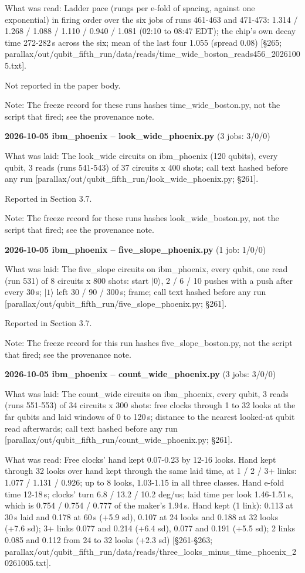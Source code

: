 \documentclass[11pt]{article}
\begin{document}
What was read: Ladder pace (rungs per e-fold of spacing, against one exponential) in firing order over the six jobs of runs 461-463 and 471-473: 1.314 / 1.268 / 1.088 / 1.110 / 0.940 / 1.081 (02:10 to 08:47 EDT); the chip's own decay time 272-282\,\textmu s across the six; mean of the last four 1.055 (spread 0.08) {[}\S{}265; parallax/out/qubit\_fifth\_run/data/reads/time\_wide\_boston\_reads456\_20261005.txt{]}.

Not reported in the paper body.

Note: The freeze record for these runs hashes time\_wide\_boston.py, not the script that fired; see the provenance note.

\textbf{2026-10-05 ibm\_phoenix -- look\_wide\_phoenix.py} (3 jobs: 3/0/0)

What was laid: The look\_wide circuits on ibm\_phoenix (120 qubits), every qubit, 3 reads (runs 541-543) of 37 circuits x 400 shots; call text hashed before any run {[}parallax/out/qubit\_fifth\_run/look\_wide\_phoenix.py; \S{}261{]}.

Reported in Section 3.7.

Note: The freeze record for these runs hashes look\_wide\_boston.py, not the script that fired; see the provenance note.

\textbf{2026-10-05 ibm\_phoenix -- five\_slope\_phoenix.py} (1 job: 1/0/0)

What was laid: The five\_slope circuits on ibm\_phoenix, every qubit, one read (run 531) of 8 circuits x 800 shots: start \(|0\rangle\), 2 / 6 / 10 pushes with a push after every 30\,\textmu s; \(|1\rangle\) left 30 / 90 / 300\,\textmu s; frame; call text hashed before any run {[}parallax/out/qubit\_fifth\_run/five\_slope\_phoenix.py; \S{}261{]}.

Reported in Section 3.7.

Note: The freeze record for this run hashes five\_slope\_boston.py, not the script that fired; see the provenance note.

\textbf{2026-10-05 ibm\_phoenix -- count\_wide\_phoenix.py} (3 jobs: 3/0/0)

What was laid: The count\_wide circuits on ibm\_phoenix, every qubit, 3 reads (runs 551-553) of 34 circuits x 300 shots: free clocks through 1 to 32 looks at the far qubits and laid windows of 0 to 120\,\textmu s; distance to the nearest looked-at qubit read afterwards; call text hashed before any run {[}parallax/out/qubit\_fifth\_run/count\_wide\_phoenix.py; \S{}261{]}.

What was read: Free clocks' hand kept 0.07-0.23 by 12-16 looks. Hand kept through 32 looks over hand kept through the same laid time, at 1 / 2 / 3+ links: 1.077 / 1.131 / 0.926; up to 8 looks, 1.03-1.15 in all three classes. Hand e-fold time 12-18\,\textmu s; clocks' turn 6.8 / 13.2 / 10.2 deg/us; laid time per look 1.46-1.51\,\textmu s, which is 0.754 / 0.754 / 0.777 of the maker's 1.94\,\textmu s. Hand kept (1 link): 0.113 at 30\,\textmu s laid and 0.178 at 60\,\textmu s (+5.9 sd), 0.107 at 24 looks and 0.188 at 32 looks (+7.6 sd); 3+ links 0.077 and 0.214 (+6.4 sd), 0.077 and 0.191 (+5.5 sd); 2 links 0.085 and 0.112 from 24 to 32 looks (+2.3 sd) {[}\S{}261-\S{}263; parallax/out/qubit\_fifth\_run/data/reads/three\_looks\_minus\_time\_phoenix\_20261005.txt{]}.
\end{document}
